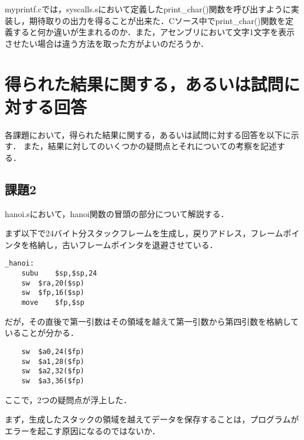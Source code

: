 \documentclass[a4j]{jarticle}
\begin{document}
myprintf.cでは，syscalls.sにおいて定義したprint\_char()関数を呼び出すように実装し，期待取りの出力を得ることが出来た．Cソース中でprint\_char()関数を定義すると何か違いが生まれるのか．また，アセンブリにおいて文字1文字を表示させたい場合は違う方法を取った方がよいのだろうか．




%
%

\section{得られた結果に関する，あるいは試問に対する回答}


各課題において，得られた結果に関する，あるいは試問に対する回答を以下に示す．
また，結果に対してのいくつかの疑問点とそれについての考察を記述する．



\subsection{課題2}


hanoi.sにおいて，hanoi関数の冒頭の部分について解説する．

まず以下で24バイト分スタックフレームを生成し，戻りアドレス，フレームポインタを格納し，古いフレームポインタを退避させている．

\begin{verbatim} 
_hanoi:
	subu	$sp,$sp,24
	sw	$ra,20($sp)
	sw	$fp,16($sp)
	move	$fp,$sp
\end{verbatim}

だが，その直後で第一引数はその領域を越えて第一引数から第四引数を格納していることが分かる．

\begin{verbatim} 
	sw	$a0,24($fp)
	sw	$a1,28($fp)
	sw	$a2,32($fp)
	sw	$a3,36($fp)
\end{verbatim} 

ここで，2つの疑問点が浮上した．

まず，生成したスタックの領域を越えてデータを保存することは，プログラムがエラーを起こす原因になるのではないか．
\end{document}

